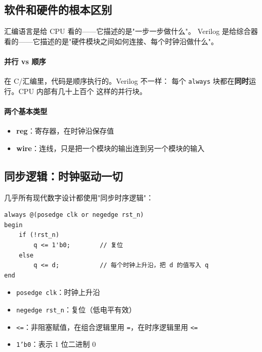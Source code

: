 \subsection{软件和硬件的根本区别}

汇编语言是给 CPU 看的——它描述的是"一步一步做什么"。
Verilog 是给综合器看的——它描述的是"硬件模块之间如何连接、每个时钟沿做什么"。

\paragraph{并行 vs 顺序}
在 C/汇编里，代码是顺序执行的。Verilog 不一样：
每个 \texttt{always} 块都在\textbf{同时}运行。CPU 内部有几十上百个
这样的并行块。

\paragraph{两个基本类型}
\begin{itemize}
    \item \textbf{reg}：寄存器，在时钟沿保存值
    \item \textbf{wire}：连线，只是把一个模块的输出连到另一个模块的输入
\end{itemize}

\subsection{同步逻辑：时钟驱动一切}

几乎所有现代数字设计都使用"同步时序逻辑"：

\begin{lstlisting}[style=verilog]
always @(posedge clk or negedge rst_n)
begin
    if (!rst_n)
        q <= 1'b0;        // 复位
    else
        q <= d;           // 每个时钟上升沿，把 d 的值写入 q
end
\end{lstlisting}

\begin{itemize}
    \item \texttt{posedge clk}：时钟上升沿
    \item \texttt{negedge rst\_n}：复位（低电平有效）
    \item \texttt{<=}：非阻塞赋值，在组合逻辑里用 \texttt{=}，在时序逻辑里用 \texttt{<=}
    \item \texttt{1'b0}：表示 1 位二进制 0
\end{itemize}

